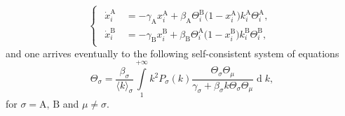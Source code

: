 \documentclass[pre,twocolumn,superscriptaddress]{revtex4}
\DeclareMathOperator{\dd}{\mathrm{d}}
\newcommand{\1}{\mathds{1}}
\begin{document}
{{\begin{displaymath}
\begin{cases}
\begin{aligned}
\dot{x}_i^{\mathrm{A}}&\,=-\gamma_\mathrm{A}x_i^{\mathrm{A}}+\beta_\mathrm{A}\Theta_i^{\mathrm{B}}\big(1-x_i^{\mathrm{A}}\big)k_i^{\mathrm{A}}\Theta_i^{\mathrm{A}},\\
\dot{x}_i^{\mathrm{B}}&\,=-\gamma_\mathrm{B}x_i^{\mathrm{B}}+\beta_\mathrm{B}\Theta_i^{\mathrm{A}}\big(1-x_i^{\mathrm{B}}\big)k_i^{\mathrm{B}}\Theta_i^{\mathrm{B}},
\end{aligned}
\end{cases}
\end{displaymath}
and one arrives eventually to the following self-consistent system of equations
\begin{displaymath}
\Theta_\sigma=\frac{\beta_\sigma}{\langle k\rangle_\sigma}\int\limits_1^{+\infty}k^2P_\sigma(k)\frac{\Theta_\sigma \Theta_\mu}{\gamma_\sigma+\beta_\sigma k\Theta_\sigma\Theta_\mu}\dd k,
\end{displaymath}
for $\sigma=\mathrm{A},\,\mathrm{B}$ and $\mu\neq\sigma$.\\}


}


\end{document}
